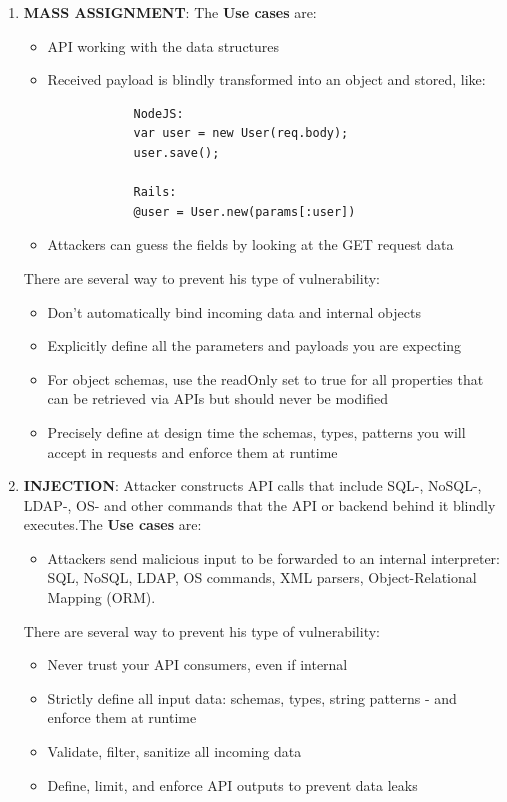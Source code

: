 \documentclass[10pt,a4paper]{report}
\begin{document}
\begin{enumerate}
\begin{itemize}
		\end{itemize}
	
	\item \textbf{MASS ASSIGNMENT}: The \textbf{Use cases} are:
	\begin{itemize}
		\item API working with the data structures
		\item Received payload is blindly transformed into an object and stored, like:
		\begin{lstlisting}
			NodeJS:
			var user = new User(req.body);
			user.save();
			
			Rails:
			@user = User.new(params[:user])
		\end{lstlisting}
		\item Attackers can guess the fields by looking at the GET request data
	\end{itemize}
	There are several way to prevent his type of vulnerability:
	\begin{itemize}
		\item Don’t automatically bind incoming data and internal objects
		\item Explicitly define all the parameters and payloads you are expecting
		\item For object schemas, use the readOnly set to true for all properties that
		can be retrieved via APIs but should never be modified
		\item Precisely define at design time the schemas, types, patterns you will
		accept in requests and enforce them at runtime
		
	\end{itemize}

		\item \textbf{INJECTION}: Attacker constructs API calls that include SQL-, NoSQL-, LDAP-, OS- and	other commands that the API or backend behind it blindly executes.The \textbf{Use cases} are:
	\begin{itemize}
		\item Attackers send malicious input to be forwarded to an internal
		interpreter: SQL, NoSQL, LDAP, OS commands, XML parsers, Object-Relational Mapping (ORM).

	\end{itemize}
	There are several way to prevent his type of vulnerability:
	\begin{itemize}
		\item Never trust your API consumers, even if internal
		\item Strictly define all input data: schemas, types, string patterns - and
		enforce them at runtime
		\item Validate, filter, sanitize all incoming data
		\item Define, limit, and enforce API outputs to prevent data leaks
		

\end{itemize}
\end{enumerate}
\end{document}
